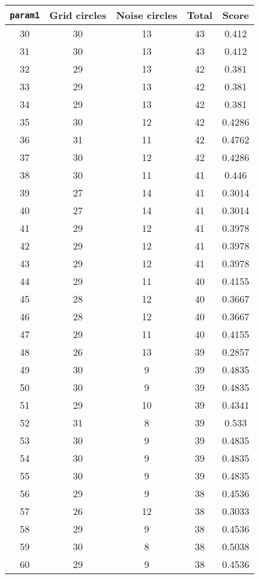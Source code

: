 \documentclass[letterpaper, 12pt]{article}
\begin{document}
\begin{longtable}{|c|c|c|c|c|}
\hline
\textbf{\texttt{param1}} & \textbf{Grid circles} & \textbf{Noise circles} & \textbf{Total} & \textbf{Score} \\
\hline
30 & 30 & 13 & 43 & 0.412 \\
\hline
31 & 30 & 13 & 43 & 0.412 \\
\hline
32 & 29 & 13 & 42 & 0.381 \\
\hline
33 & 29 & 13 & 42 & 0.381 \\
\hline
34 & 29 & 13 & 42 & 0.381 \\
\hline
35 & 30 & 12 & 42 & 0.4286 \\
\hline
36 & 31 & 11 & 42 & 0.4762 \\
\hline
37 & 30 & 12 & 42 & 0.4286 \\
\hline
38 & 30 & 11 & 41 & 0.446 \\
\hline
39 & 27 & 14 & 41 & 0.3014 \\
\hline
40 & 27 & 14 & 41 & 0.3014 \\
\hline
41 & 29 & 12 & 41 & 0.3978 \\
\hline
42 & 29 & 12 & 41 & 0.3978 \\
\hline
43 & 29 & 12 & 41 & 0.3978 \\
\hline
44 & 29 & 11 & 40 & 0.4155 \\
\hline
45 & 28 & 12 & 40 & 0.3667 \\
\hline
46 & 28 & 12 & 40 & 0.3667 \\
\hline
47 & 29 & 11 & 40 & 0.4155 \\
\hline
48 & 26 & 13 & 39 & 0.2857 \\
\hline
49 & 30 & 9 & 39 & 0.4835 \\
\hline
50 & 30 & 9 & 39 & 0.4835 \\
\hline
51 & 29 & 10 & 39 & 0.4341 \\
\hline
52 & 31 & 8 & 39 & 0.533 \\
\hline
53 & 30 & 9 & 39 & 0.4835 \\
\hline
54 & 30 & 9 & 39 & 0.4835 \\
\hline
55 & 30 & 9 & 39 & 0.4835 \\
\hline
56 & 29 & 9 & 38 & 0.4536 \\
\hline
57 & 26 & 12 & 38 & 0.3033 \\
\hline
58 & 29 & 9 & 38 & 0.4536 \\
\hline
59 & 30 & 8 & 38 & 0.5038 \\
\hline
60 & 29 & 9 & 38 & 0.4536 \\
\hline

\end{longtable}
\end{document}
